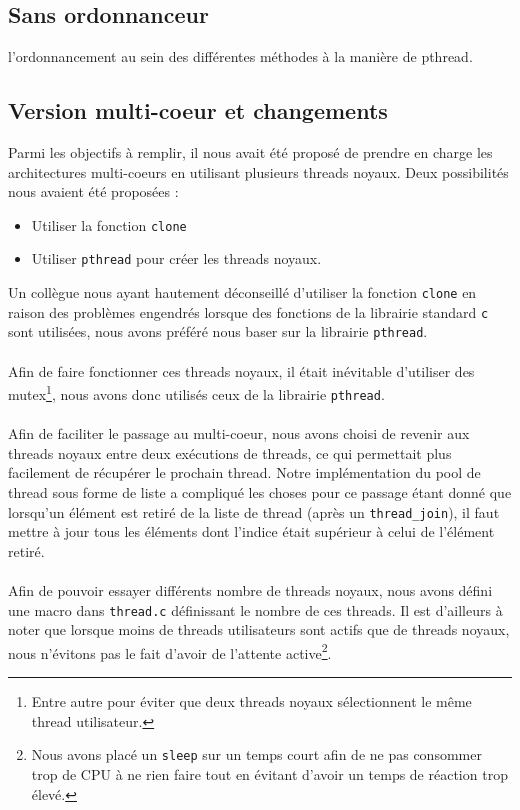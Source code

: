 \documentclass{article}
\begin{document}
		\subsection{Sans ordonnanceur}
		l'ordonnancement au sein des différentes méthodes à la manière
        de pthread.

		\subsection{Version multi-coeur et changements}
		Parmi les objectifs à remplir, il nous avait été proposé de prendre
        en charge les architectures multi-coeurs en utilisant plusieurs
        threads noyaux. Deux possibilités nous avaient été proposées :
        \begin{itemize}
          \item Utiliser la fonction \verb!clone!
          \item Utiliser \verb!pthread! pour créer les threads noyaux.
        \end{itemize}
        Un collègue nous ayant hautement déconseillé d'utiliser la fonction
        \verb!clone! en raison des problèmes engendrés lorsque des fonctions
        de la librairie standard \verb!c! sont utilisées, nous avons préféré
        nous baser sur la librairie \verb!pthread!.
        \paragraph{}
        Afin de faire fonctionner ces threads noyaux, il était inévitable
        d'utiliser des mutex\footnote{Entre autre pour éviter que deux
          threads noyaux sélectionnent le même thread utilisateur.}, nous
        avons donc utilisés ceux de la librairie \verb!pthread!. 
        \paragraph{}
        Afin de faciliter le passage au multi-coeur, nous avons choisi
        de revenir aux threads noyaux entre deux exécutions de threads, ce
        qui permettait plus facilement de récupérer le prochain thread. Notre
        implémentation du pool de thread sous forme de liste a compliqué les
        choses pour ce passage étant donné que lorsqu'un élément est retiré
        de la liste de thread (après un \verb!thread_join!), il faut mettre
        à jour tous les éléments dont l'indice était supérieur à celui de
        l'élément retiré.
        \paragraph{}
        Afin de pouvoir essayer différents nombre de threads noyaux, nous
        avons défini une macro dans \verb!thread.c! définissant le nombre
        de ces threads. Il est d'ailleurs à noter que lorsque moins de
        threads utilisateurs sont actifs que de threads noyaux, nous
        n'évitons pas le fait d'avoir de l'attente active\footnote{Nous avons
          placé un \verb!sleep! sur un temps court afin de ne pas consommer
          trop de CPU à ne rien faire tout en évitant d'avoir un temps de
          réaction trop élevé.}.
\end{document}
